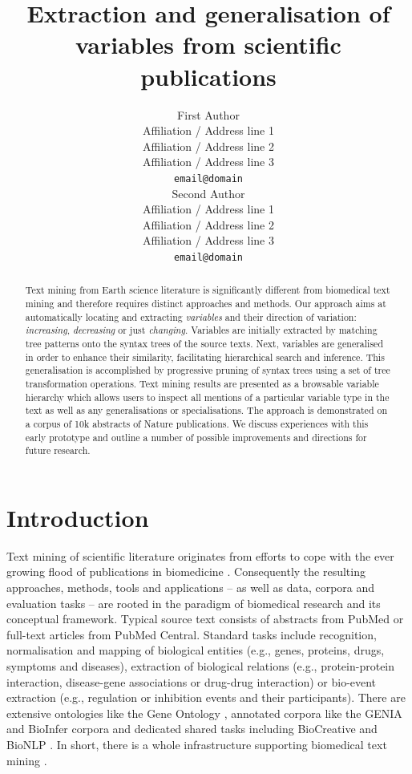 \documentclass[11pt]{article}
\title{Extraction and generalisation of variables from scientific publications}
\author{First Author \\
  Affiliation / Address line 1 \\
  Affiliation / Address line 2 \\
  Affiliation / Address line 3 \\
  {\tt email@domain} \\\And
  Second Author \\
  Affiliation / Address line 1 \\
  Affiliation / Address line 2 \\
  Affiliation / Address line 3 \\
  {\tt email@domain} \\}
\date{}
\begin{document}
\maketitle

\begin{abstract}
Text mining from Earth science literature is significantly different from biomedical text mining and therefore requires distinct approaches and methods.
Our approach aims at automatically locating and extracting \emph{variables} and their direction of variation: \emph{increasing}, \emph{decreasing} or just \emph{changing}. 
Variables are initially extracted by matching tree patterns onto the syntax trees of the source texts.
Next, variables are generalised in order to enhance their similarity, facilitating hierarchical search and inference.
This generalisation is accomplished by progressive pruning of syntax trees using a set of tree transformation operations.
Text mining results are presented as a browsable variable hierarchy which allows users to inspect all mentions of a particular variable type in the text as well as any generalisations or specialisations.
The approach is demonstrated on a corpus of 10k abstracts of Nature publications.
We discuss experiences with this early prototype and outline a number of possible improvements and directions for future research.
\end{abstract}


\section{Introduction}

Text mining of scientific literature originates from efforts to cope with the ever growing flood of publications in biomedicine \cite{Swanson1986Fish,Swa88,Swanson1997Interactive,Hearst:1999aa,Ananiadou2006,Zweigenbaum2007Frontiers,Cohen2005Survey,Krallinger2008Linking,RodriguezEsteban2009Biomedical,Zweigenbaum2009Advanced,Ananiadou2010Event,Simpson2012Biomedical,ananiadou2014event}.
Consequently the resulting approaches, methods, tools and applications -- as well as data, corpora and evaluation tasks -- are rooted in the paradigm of biomedical research and its conceptual framework.
Typical source text consists of abstracts from PubMed or full-text articles from PubMed Central.
Standard tasks include recognition, normalisation and mapping of biological entities (e.g., genes, proteins, drugs, symptoms and diseases), extraction of biological relations (e.g., protein-protein interaction, disease-gene associations or drug-drug interaction) or bio-event extraction (e.g., regulation or inhibition events and their participants). 
There are extensive ontologies like the Gene Ontology \cite{ConsortiumTheGeneOntology2001Creating}, annotated corpora like the GENIA \cite{Kim2003GENIA} and BioInfer \cite{Pyysalo:2007} corpora and  dedicated shared tasks including BioCreative \cite{Hirschman2005Overview} and BioNLP \cite{Pyysalo2012Overview}.
In short, there is a whole infrastructure supporting biomedical text mining \cite{Cohen2008Getting}.
\end{document}
